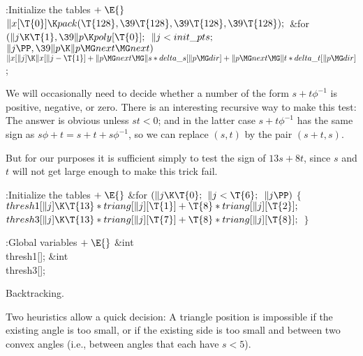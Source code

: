 \B{}:Initialize the tables\X${}\mathrel+\E{}$\6
$\|x[\T{0}]\K\\{pack}(\T{128},\39\T{128},\39\T{128},\39\T{128});{}$\6
\&{for} ${}(\|j\K\T{1},\39\|p\K\\{poly}[\T{0}];{}$ ${}\|j<\\{init\_pts};{}$ ${}%
\|j\PP,\39\|p\K\|p\MG\\{next}\MG\\{next}){}$\1\5
${}\|x[\|j]\K\|x[\|j-\T{1}]+\|p\MG\\{next}\MG\|s*\\{delta\_s}[\|p\MG\\{dir}]+%
\|p\MG\\{next}\MG\|t*\\{delta\_t}[\|p\MG\\{dir}]{}$;\2\par
\fi

We will occasionally need to decide whether a number of the form
$s+t\phi^{-1}$ is positive, negative, or zero. There is an interesting
recursive way to make this test: The answer is obvious unless $st<0$;
and in the latter case $s+t\phi^{-1}$ has the same sign as $s\phi+t=
s+t+s\phi^{-1}$, so we can replace $(s,t)$ by the pair $(s+t,s)$.

But for our purposes it is sufficient simply to test the sign of $13s+8t$,
since $s$ and $t$ will not get large enough to make this trick fail.

\Y\B\4:Initialize the tables\X${}\mathrel+\E{}$\6
\&{for} ${}(\|j\K\T{0};{}$ ${}\|j<\T{6};{}$ ${}\|j\PP){}$\5
${}\{{}$\1\6
${}\\{thresh1}[\|j]\K\T{13}*\\{triang}[\|j][\T{1}]+\T{8}*\\{triang}[\|j][%
\T{2}];{}$\6
${}\\{thresh3}[\|j]\K\T{13}*\\{triang}[\|j][\T{7}]+\T{8}*\\{triang}[\|j][%
\T{8}];{}$\6
\4${}\}{}$\2\par
\fi

\B{}:Global variables\X${}\mathrel+\E{}$\6
\&{int} \\{thresh1}[];\6
\&{int} \\{thresh3}[];\par
\fi

Backtracking.

Two heuristics allow a quick decision: A triangle position is impossible
if the existing angle is too small, or if the existing
side is too small and between two convex angles (i.e., between angles
that each have $s<5$).

